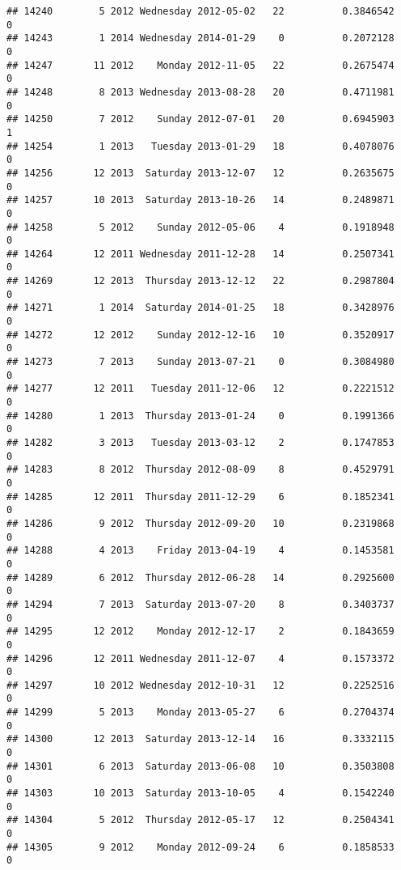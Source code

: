 \documentclass[
]{article}
\begin{document}
\begin{verbatim}
## 14240        5 2012 Wednesday 2012-05-02   22          0.3846542             0
## 14243        1 2014 Wednesday 2014-01-29    0          0.2072128             0
## 14247       11 2012    Monday 2012-11-05   22          0.2675474             0
## 14248        8 2013 Wednesday 2013-08-28   20          0.4711981             0
## 14250        7 2012    Sunday 2012-07-01   20          0.6945903             1
## 14254        1 2013   Tuesday 2013-01-29   18          0.4078076             0
## 14256       12 2013  Saturday 2013-12-07   12          0.2635675             0
## 14257       10 2013  Saturday 2013-10-26   14          0.2489871             0
## 14258        5 2012    Sunday 2012-05-06    4          0.1918948             0
## 14264       12 2011 Wednesday 2011-12-28   14          0.2507341             0
## 14269       12 2013  Thursday 2013-12-12   22          0.2987804             0
## 14271        1 2014  Saturday 2014-01-25   18          0.3428976             0
## 14272       12 2012    Sunday 2012-12-16   10          0.3520917             0
## 14273        7 2013    Sunday 2013-07-21    0          0.3084980             0
## 14277       12 2011   Tuesday 2011-12-06   12          0.2221512             0
## 14280        1 2013  Thursday 2013-01-24    0          0.1991366             0
## 14282        3 2013   Tuesday 2013-03-12    2          0.1747853             0
## 14283        8 2012  Thursday 2012-08-09    8          0.4529791             0
## 14285       12 2011  Thursday 2011-12-29    6          0.1852341             0
## 14286        9 2012  Thursday 2012-09-20   10          0.2319868             0
## 14288        4 2013    Friday 2013-04-19    4          0.1453581             0
## 14289        6 2012  Thursday 2012-06-28   14          0.2925600             0
## 14294        7 2013  Saturday 2013-07-20    8          0.3403737             0
## 14295       12 2012    Monday 2012-12-17    2          0.1843659             0
## 14296       12 2011 Wednesday 2011-12-07    4          0.1573372             0
## 14297       10 2012 Wednesday 2012-10-31   12          0.2252516             0
## 14299        5 2013    Monday 2013-05-27    6          0.2704374             0
## 14300       12 2013  Saturday 2013-12-14   16          0.3332115             0
## 14301        6 2013  Saturday 2013-06-08   10          0.3503808             0
## 14303       10 2013  Saturday 2013-10-05    4          0.1542240             0
## 14304        5 2012  Thursday 2012-05-17   12          0.2504341             0
## 14305        9 2012    Monday 2012-09-24    6          0.1858533             0

\end{verbatim}
\end{document}
